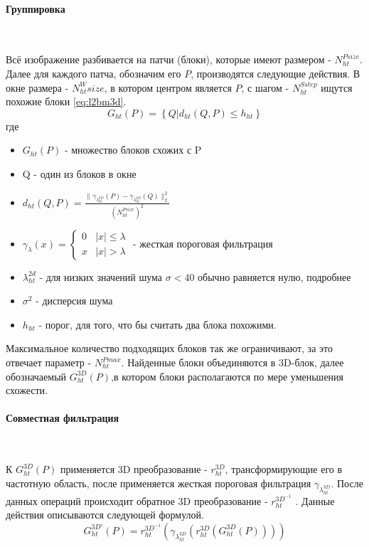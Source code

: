 \paragraph{Группировка}\

Всё изображение разбивается на патчи (блоки), которые имеют размером - $N_{ht}^{Psize}$.  Далее для каждого патча, обозначим его $P$, производятся следующие действия. В окне размера - $N_{ht}^Wsize$, в котором центром является $P$, с шагом - $N_{ht}^{Sstep}$ ищутся похожие блоки  \ref{eq:l2bm3d}.
\begin{equation}\label{eq:l2bm3d}
	G_{ht}(P) = \left\{Q | d_{ht}(Q,P) \leq h_{ht}\right\}
\end{equation}
где
\begin{itemize}
	\item $G_{ht}(P)$ - множество блоков схожих с P
	\item Q - один из блоков в окне
	\item $d_{ht}(Q,P) = \frac{\parallel\gamma_{\lambda_{ht}^{2D}}(P)-\gamma_{\lambda_{ht}^{2D}}(Q)\parallel_2^2}{(N_{ht}^{Psize})^2}$
	\item $\gamma_{\lambda}(x) = \begin{cases}0 &|x| \leq \lambda\\ x & |x| > \lambda\end{cases}$ - жесткая пороговая фильтрация 
	\item $\lambda_{ht}^{2d}$ - для низких значений шума $\sigma < 40$ обычно равняется нулю, подробнее \cite{dabov}
	\item $\sigma^2$ -  дисперсия шума
	\item $h_{ht}$ - порог, для того, что бы считать два блока похожими.
\end{itemize}
Максимальное количество подходящих блоков так же ограничивают, за это отвечает параметр - $N_{ht}^{Pmax}$. Найденные блоки объединяются в 3D-блок, далее обозначаемый $G_{ht}^{3D}(P)$,в котором блоки располагаются по мере уменьшения схожести.

\paragraph{Совместная фильтрация}\

К $G_{ht}^{3D}(P)$ применяется 3D преобразование - $r_{ht}^{3D}$, трансформирующие его в частотную область, после применяется жесткая пороговая фильтрация $\gamma_{\lambda_{ht}^{3D}}$. После данных операций происходит обратное 3D преобразование - $r_{ht}^{3D^{-1}}$ . Данные действия описываются следующей формулой.
\begin{equation}
G_{ht}^{3D'}(P) = r_{ht}^{3D^{-1}}(\gamma_{\lambda_{ht}^{3D}}(r_{ht}^{3D}(G_{ht}^{3D}(P))))
\end{equation}

